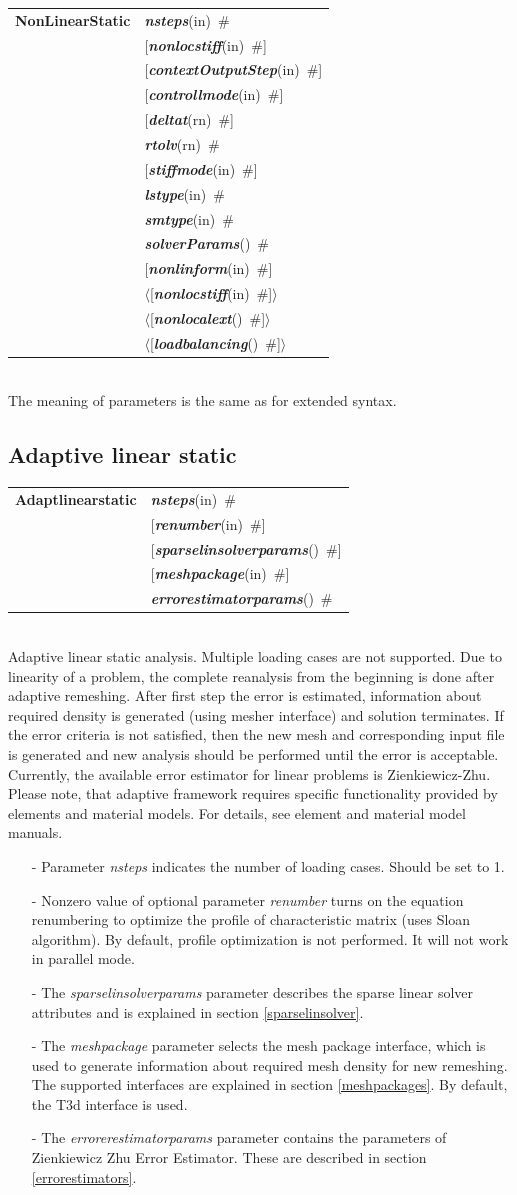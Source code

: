 \documentclass[a4paper]{article}
\makeatletter
\newcommand{\param}[1]{{\em #1}}
\newcommand{\keywordnotype}[1]{\mbox{{\it{\bf{#1}}}}}
\newcommand{\keyword}[2]{\mbox{{\keywordnotype{#1}\tiny (#2)}}}
\newcommand{\entKeywordInst}[1]{\mbox{{\bf{{#1}}}}}
\newcommand{\field}[2]{\mbox{\keyword{#1}{#2}~\#}}
\newcommand{\optField}[2]{\mbox{[\field{#1}{#2}]}}
\newcommand{\PoptField}[2]{\mbox{$\langle$[\field{#1}{#2}]$\rangle$}}
\newenvironment{record}[1][]{\begin{tabular}{|ll}}{\end{tabular}\\}
\newcommand{\recentry}[2]{{#1}&{#2}\\}
\newcounter{rcc}
\newenvironment{record}[1][\textwidth]{\setcounter{rcc}{0}\begin{tabular*}{#1}{|ll@{\extracolsep{\fill}}r}}{\end{tabular*}\\}
\newcommand{\recentry}[2]{\ifthenelse{\value{rcc}>0}{&$\backslash$ \\}{\setcounter{rcc}{1}}{#1}&{#2}}
\makeatother
\begin{document}
\noindent
\begin{record}
\recentry{\entKeywordInst{NonLinearStatic}}{\field{nsteps}{in}}
\recentry{}{\optField{nonlocstiff}{in}}
\recentry{}{\optField{contextOutputStep}{in}} \recentry{}{\optField{controllmode}{in}}
\recentry{}{\optField{deltat}{rn}}
\recentry{}{\field{rtolv}{rn}} \recentry{}{\optField{stiffmode}{in}} \recentry{}{\field{lstype}{in}}
\recentry{}{\field{smtype}{in}} \recentry{}{\field{solverParams}{}}
\recentry{}{\optField{nonlinform}{in}}
\recentry{}{\PoptField{nonlocstiff}{in}}
\recentry{}{\PoptField{nonlocalext}{}} \recentry{}{\PoptField{loadbalancing}{}}
\end{record}
The meaning of parameters is the same as for extended syntax.

%
\subsection{Adaptive linear static}
\label{AdaptiveLinearStatic}
\begin{record}
\recentry{\entKeywordInst{Adaptlinearstatic}}{\field{nsteps}{in}}
\recentry{}{\optField{renumber}{in}}
\recentry{}{\optField{sparselinsolverparams}{}} \recentry{}{\optField{meshpackage}{in}}
\recentry{}{\field{errorestimatorparams}{}}
\end{record}
Adaptive linear static analysis. Multiple loading cases are not
supported. Due to linearity of a problem, the complete reanalysis from
the beginning is done after adaptive remeshing.
After first step the error is estimated, information about required density is generated
(using mesher interface) and solution terminates. If the error
criteria is not satisfied, then the new mesh
and corresponding input file is generated and new analysis should be
performed until the error is acceptable.
Currently, the available error estimator for linear problems is
Zienkiewicz-Zhu. Please note, that adaptive framework requires
specific functionality provided by elements and material models. For
details, see element and material model manuals.
\begin{itemize}
\item[-]
Parameter \param{nsteps} indicates the number of loading cases.
Should be set to 1.
\item[-]
Nonzero value of optional parameter \param{renumber} turns on the
equation renumbering to optimize the profile of characteristic matrix
(uses Sloan algorithm). By default, profile optimization is not
performed. It will not work in parallel mode.
\item[-]
The  \param{sparselinsolverparams} parameter describes the sparse
linear solver attributes and is explained in section \ref{sparselinsolver}.
\item[-]
The \param{meshpackage} parameter selects the mesh package interface,
which is used to generate information about required mesh density for
new remeshing. The supported interfaces are explained in section
\ref{meshpackages}. By default, the T3d interface is used.
\item[-]
The \param{errorerestimatorparams} parameter contains the parameters
of Zien\-kie\-wicz Zhu Error Estimator. These are described in section \ref{errorestimators}.
\end{itemize}
\end{document}
